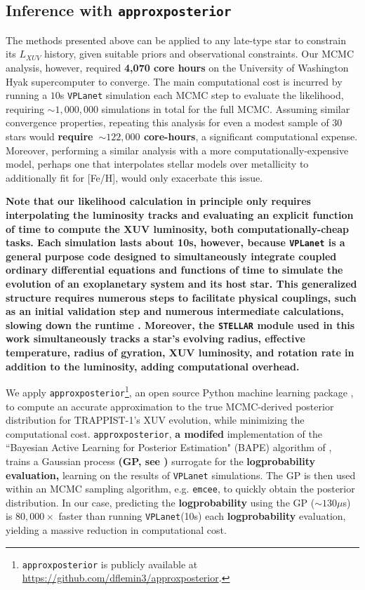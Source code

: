 \documentclass[twocolumn]{aastex62}
\newcommand{\xxx}[1]{{\textbf{#1}}}
\newcommand{\vplanet}[0]{\texttt{VPLanet}\xspace}
\newcommand{\emcee}[0]{\texttt{emcee}\xspace}
\newcommand{\approxposterior}[0]{\texttt{approxposterior}\xspace}
\newcommand{\stellar}[0]{\texttt{STELLAR}\xspace}
\begin{document}
\subsection{Inference with \approxposterior} \label{sec:methods:approx}

The methods presented above can be applied to any late-type star to constrain its $L_{XUV}$ history, given suitable priors and observational constraints. Our MCMC analysis, however, required \xxx{4,070 core hours} on the University of Washington Hyak supercomputer to converge. The main computational cost is incurred by running a $10$s \vplanet simulation each MCMC step to evaluate the likelihood, requiring ${\sim}1,000,000$ simulations in total for the full MCMC. Assuming similar convergence properties, repeating this analysis for even a modest sample of 30 stars would \xxx{require~${\sim} 122,000$ core-hours}, a significant computational expense. Moreover, performing a similar analysis with a more computationally-expensive model, perhaps one that interpolates stellar models over metallicity to additionally fit for [Fe/H], would only exacerbate this issue.

\xxx{Note that our likelihood calculation in principle only requires interpolating the \citet{Baraffe2015} luminosity tracks and evaluating an explicit function of time to compute the XUV luminosity, both computationally-cheap tasks. Each simulation lasts about 10s, however, because \vplanet is a general purpose code designed to simultaneously integrate coupled ordinary differential equations and functions of time to simulate the evolution of an exoplanetary system and its host star. This generalized structure requires numerous steps to facilitate physical couplings, such as an initial validation step and numerous intermediate calculations, slowing down the runtime \citep[for more details, see][]{Barnes2019}. Moreover, the \stellar module used in this work simultaneously tracks a star's evolving radius, effective temperature, radius of gyration, XUV luminosity, and rotation rate in addition to the luminosity, adding computational overhead.}

We apply \approxposterior\footnote{\approxposterior is publicly available at \href{https://github.com/dflemin3/approxposterior}{https://github.com/dflemin3/approxposterior}.}, an open source Python machine learning package \citep{FlemingVanderPlas2018}, to compute an accurate approximation to the true MCMC-derived posterior distribution for TRAPPIST-1's XUV evolution, while minimizing the computational cost. \approxposterior, \xxx{a modifed} implementation of the ``Bayesian Active Learning for Posterior Estimation" (BAPE) algorithm of \citet{Kandasamy2017}, trains a Gaussian process \xxx{(GP, see \citet{Rasmussen2006})} surrogate for the \xxx{logprobability evaluation,} learning on the results of \vplanet simulations. The GP is then used within an MCMC sampling algorithm, e.g. \emcee, to quickly obtain the posterior distribution. In our case, predicting the \xxx{logprobability} using the GP (${\sim} 130 \mu$s) is $80,000 \times$ faster than running \vplanet (10s) each \xxx{logprobability} evaluation, yielding a massive reduction in computational cost.
\end{document}
